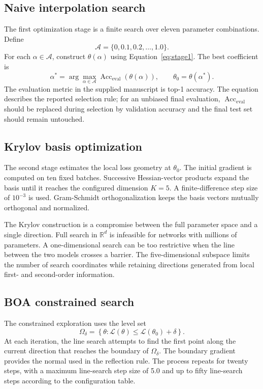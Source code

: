 \documentclass[11pt,a4paper]{article}
\newcommand{\R}{\mathbb{R}}
\begin{document}
\subsection{Naive interpolation search}
The first optimization stage is a finite search over eleven parameter combinations. Define
\begin{equation}
 \mathcal{A}=\{0,0.1,0.2,\ldots,1.0\}.
\end{equation}
For each $\alpha\in\mathcal{A}$, construct $\theta(\alpha)$ using Equation~\eqref{eq:stage1}. The best coefficient is
\begin{equation}
 \alpha^*=\arg\max_{\alpha\in\mathcal{A}}
 \operatorname{Acc}_{\mathrm{eval}}(\theta(\alpha)),
 \qquad \theta_0=\theta(\alpha^*).
 \label{eq:alpha_star}
\end{equation}
The evaluation metric in the supplied manuscript is top-1 accuracy. The equation describes the reported selection rule; for an unbiased final evaluation, $\operatorname{Acc}_{\mathrm{eval}}$ should be replaced during selection by validation accuracy and the final test set should remain untouched.

\subsection{Krylov basis optimization}
The second stage estimates the local loss geometry at $\theta_0$. The initial gradient is computed on ten fixed batches. Successive Hessian-vector products expand the basis until it reaches the configured dimension $K=5$. A finite-difference step size of $10^{-3}$ is used. Gram-Schmidt orthogonalization keeps the basis vectors mutually orthogonal and normalized.

The Krylov construction is a compromise between the full parameter space and a single direction. Full search in $\R^d$ is infeasible for networks with millions of parameters. A one-dimensional search can be too restrictive when the line between the two models crosses a barrier. The five-dimensional subspace limits the number of search coordinates while retaining directions generated from local first- and second-order information.

\subsection{BOA constrained search}
The constrained exploration uses the level set
\begin{equation}
 \Omega_\delta=\left\{\theta:\mathcal{L}(\theta)
 \leq\mathcal{L}(\theta_0)+\delta\right\}.
 \label{eq:omega}
\end{equation}
At each iteration, the line search attempts to find the first point along the current direction that reaches the boundary of $\Omega_\delta$. The boundary gradient provides the normal used in the reflection rule. The process repeats for twenty steps, with a maximum line-search step size of 5.0 and up to fifty line-search steps according to the configuration table.
\end{document}
